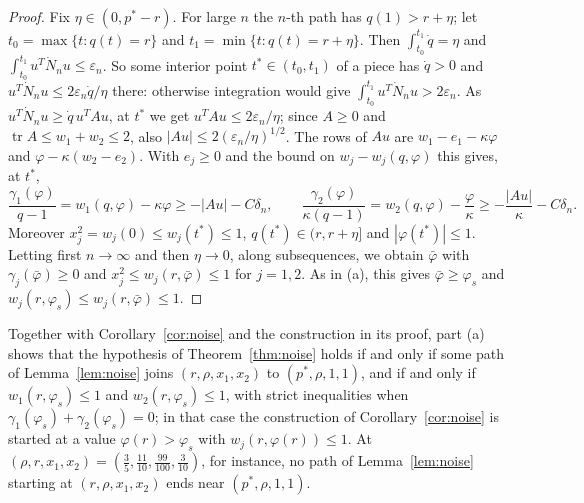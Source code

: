 \documentclass[11pt]{amsart}
\theoremstyle{definition}
\begin{document}
\begin{proof}
Fix $\eta\in(0,p^*-r)$. For large $n$ the $n$-th path has $q(1)>r+\eta$; let $t_0=\max\{t:q(t)=r\}$ and
$t_1=\min\{t:q(t)=r+\eta\}$. Then $\int_{t_0}^{t_1}\dot q=\eta$ and $\int_{t_0}^{t_1}u^T\dot N_nu\le\varepsilon_n$. So
some interior point $t^*\in(t_0,t_1)$ of a piece has $\dot q>0$ and $u^T\dot N_nu\le2\varepsilon_n\dot q/\eta$ there:
otherwise integration would give $\int_{t_0}^{t_1}u^T\dot N_nu>2\varepsilon_n$. As $u^T\dot N_nu\ge\dot q\,u^TAu$, at
$t^*$ we get $u^TAu\le2\varepsilon_n/\eta$; since $A\ge0$ and $\operatorname{tr}A\le w_1+w_2\le2$, also
$|Au|\le2(\varepsilon_n/\eta)^{1/2}$. The rows of $Au$ are $w_1-e_1-\kappa\varphi$ and $\varphi-\kappa(w_2-e_2)$. With
$e_j\ge0$ and the bound on $w_j-w_j(q,\varphi)$ this gives, at $t^*$,
\[
\frac{\gamma_1(\varphi)}{q-1}=w_1(q,\varphi)-\kappa\varphi\ge-|Au|-C\delta_n,\qquad
\frac{\gamma_2(\varphi)}{\kappa(q-1)}=w_2(q,\varphi)-\frac\varphi\kappa\ge-\frac{|Au|}\kappa-C\delta_n .
\]
Moreover $x_j^2=w_j(0)\le w_j(t^*)\le1$, $q(t^*)\in(r,r+\eta]$ and $|\varphi(t^*)|\le1$. Letting first $n\to\infty$
and then $\eta\to0$, along subsequences, we obtain $\bar\varphi$ with $\gamma_j(\bar\varphi)\ge0$ and
$x_j^2\le w_j(r,\bar\varphi)\le1$ for $j=1,2$. As in (a), this gives $\bar\varphi\ge\varphi_s$ and
$w_j(r,\varphi_s)\le w_j(r,\bar\varphi)\le1$.
\end{proof}

Together with Corollary~\ref{cor:noise} and the construction in its proof, part (a) shows that the hypothesis of
Theorem~\ref{thm:noise} holds if and only if some path of Lemma~\ref{lem:noise} joins $(r,\rho,x_1,x_2)$ to
$(p^*,\rho,1,1)$, and if and only if $w_1(r,\varphi_s)\le1$ and $w_2(r,\varphi_s)\le1$, with strict inequalities when
$\gamma_1(\varphi_s)+\gamma_2(\varphi_s)=0$; in that case the construction of Corollary~\ref{cor:noise} is started at a
value $\varphi(r)>\varphi_s$ with $w_j(r,\varphi(r))\le1$. At $(\rho,r,x_1,x_2)=(\frac35,\frac{11}{10},\frac{99}{100},\frac3{10})$,
for instance, no path of Lemma~\ref{lem:noise} starting at $(r,\rho,x_1,x_2)$ ends near $(p^*,\rho,1,1)$.
\end{document}
